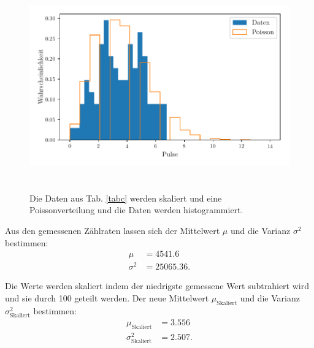 \begin{figure}
    \centering
    \includegraphics[width=15cm, height=9cm]{build/plote.pdf}
    \caption{Die Daten aus Tab. \ref{tabc} werden skaliert und eine Poissonverteilung und die Daten werden histogrammiert.}
    \label{fig:histogramm2}
\end{figure}
\noindent Aus den gemessenen Zählraten lassen sich der  Mittelwert $\mu$ und die Varianz $\sigma^2$ bestimmen: %
\begin{align*}
    \mu &= \num{4541.6} \\
    \sigma^2 &= \num{25065.36}.
\end{align*}

Die Werte werden skaliert indem der niedrigste gemessene Wert subtrahiert wird und sie durch \num{100} geteilt werden. 
\noindent Der neue Mittelwert $\mu_\text{Skaliert}$ und die Varianz $\sigma^2_\text{Skaliert}$ bestimmen: %
\begin{align*}
    \mu_\text{Skaliert} &= \num{3.556} \\
    \sigma^2_\text{Skaliert} &= \num{2.507}.
\end{align*}

